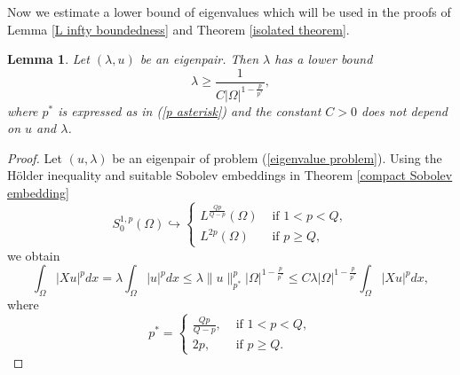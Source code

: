 \documentclass[a4paper,12pt,reqno]{amsart}
\renewcommand\eqref[1]{(\ref{#1})} %
\numberwithin{equation}{section}
\theoremstyle{plain}
\newtheorem{lem}[thm]{Lemma}
\theoremstyle{definition}
\begin{document}
Now we estimate a lower bound of eigenvalues which will be used in the proofs of Lemma \ref{L infty boundedness} and Theorem \ref{isolated theorem}.
\begin{lem} \label{lower bound lemma}
Let $(\lambda,u)$ be an eigenpair. Then $\lambda$ has a lower bound
\begin{equation}\label{lower bound of eigenvalues}
\lambda \geq  \frac{1}{C|\Omega|^{1-\frac{p}{p^{*}}}}, 
\end{equation}
where $p^{*}$ is expressed as in \eqref{p asterisk} and the constant $C>0$ does not depend on $u$ and $\lambda$.
\end{lem}
\begin{proof}
Let $(u,\lambda)$ be an eigenpair of problem \eqref{eigenvalue problem}. Using the H\"older inequality and suitable Sobolev embeddings in Theorem \ref{compact Sobolev embedding}
\begin{equation*}
S_{0}^{1,p}(\Omega)\hookrightarrow\begin{cases}
L^{\frac{Qp}{Q-p}}(\Omega) & \text{ if } 1<p<Q,\\
L^{2p}(\Omega) & \text{ if } p\geq Q,
\end{cases}
\end{equation*}
we obtain
\begin{equation*}
\int_{\Omega}|X u|^{p} d x= \lambda\int_{\Omega}|u|^{p} d x\leq \lambda\|u\|_{p^{*}}^{p}|\Omega|^{1-\frac{p}{p^{*}}}\leq C\lambda|\Omega|^{1-\frac{p}{p^{*}}}\int_{\Omega}|X u|^{p} d x ,
\end{equation*}
where 
\begin{equation}\label{p asterisk}
p^{*}=\begin{cases}
\frac{Qp}{Q-p},& \text{ if } 1<p<Q,\\
2p,& \text{ if } p\geq Q.
\end{cases}
\end{equation}

\end{proof}
\end{document}
